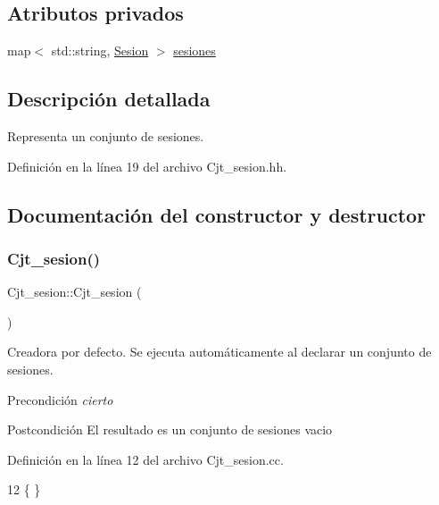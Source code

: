 \subsection*{Atributos privados}
\begin{DoxyCompactItemize}
\item 
map$<$ std\+::string, \mbox{\hyperlink{class_sesion}{Sesion}} $>$ \mbox{\hyperlink{class_cjt__sesion_abac1c2ee3cccc598a8274c7da869aa9b}{sesiones}}
\end{DoxyCompactItemize}


\subsection{Descripción detallada}
Representa un conjunto de sesiones. 

Definición en la línea 19 del archivo Cjt\+\_\+sesion.\+hh.



\subsection{Documentación del constructor y destructor}
\mbox{\label{class_cjt__sesion_a706661671b7bc84b6537f4b074938551}} 
\subsubsection{\texorpdfstring{Cjt\+\_\+sesion()}{Cjt\_sesion()}}
{\footnotesize\ttfamily Cjt\+\_\+sesion\+::\+Cjt\+\_\+sesion (\begin{DoxyParamCaption}{ }\end{DoxyParamCaption})}



Creadora por defecto. Se ejecuta automáticamente al declarar un conjunto de sesiones. 

\begin{DoxyPrecond}{Precondición}
{\itshape cierto} 
\end{DoxyPrecond}
\begin{DoxyPostcond}{Postcondición}
El resultado es un conjunto de sesiones vacio 
\end{DoxyPostcond}


Definición en la línea 12 del archivo Cjt\+\_\+sesion.\+cc.


\begin{DoxyCode}
12 \{ \}
\end{DoxyCode}
\mbox{\label{class_cjt__sesion_aa6e81cd2268224ee70b0bc22df14ed5e}} 
